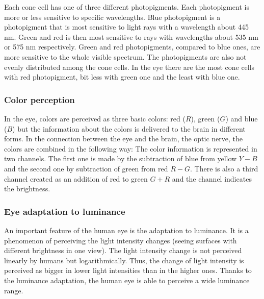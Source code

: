 \documentclass[thesis=B,english]{FITthesis}[2019/12/23]
\begin{document}
            Each cone cell has one of three different photopigments. Each photopigment is more or less sensitive to specific wavelengths. Blue photopigment is a photopigment that is most sensitive to light rays with a wavelength about 445 nm. Green and red is then most sensitive to rays with wavelengths about 535 nm or 575 nm respectively. Green and red photopigments, compared to blue ones, are more sensitive to the whole visible spectrum. The photopigments are also not evenly distributed among the cone cells. In the eye there are the most cone cells with red photopigment, bit less with green one and the least with blue one.
            
            \subsubsection*{Color perception}
            
            In the eye, colors are perceived as three basic colors: red (\(R\)), green (\(G\)) and blue (\(B\)) but the information about the colors is delivered to the brain in different forms. In the connection between the eye and the brain, the optic nerve, the colors are combined in the following way: The color information is represented in two channels. The first one is made by the subtraction of blue from yellow \(Y - B\) and the second one by subtraction of green from red \(R - G\). There is also a third channel created as an addition of red to green \(G + R\) and the channel indicates the brightness.
            
            \subsubsection*{Eye adaptation to luminance}
            
            An important feature of the human eye is the adaptation to luminance. It is a phenomenon of perceiving the light intensity changes (seeing surfaces with different brightness in one view). The light intensity change is not perceived linearly by humans but logarithmically. Thus, the change of light intensity is perceived as bigger in lower light intensities than in the higher ones. Thanks to the luminance adaptation, the human eye is able to perceive a wide luminance range.
            
\end{document}
